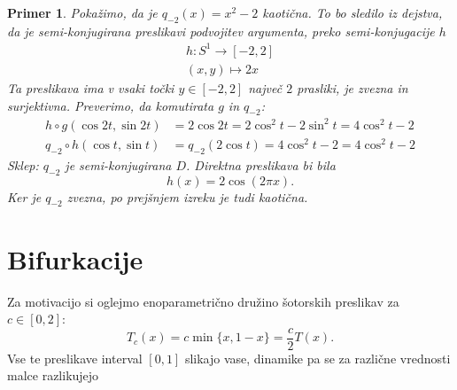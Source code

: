 \documentclass{article}
\newtheorem{primer}{Primer}
\begin{document}
\begin{primer}
Pokažimo, da je $q_{-2}(x) = x^2 - 2$ kaotična. To bo sledilo iz dejstva, da je 
semi-konjugirana preslikavi podvojitev argumenta, preko semi-konjugacije $h$ 
\begin{align*}
h: S^1 \rightarrow [-2, 2] \\ 
(x, y) \mapsto 2x 
\end{align*}
Ta preslikava ima v vsaki točki $y\in [-2, 2]$ največ $2$ prasliki, je zvezna in 
surjektivna. Preverimo, da komutirata $g$ in $q_{-2}$:
\begin{align*}
h\circ g(\cos{2t}, \sin{2t}) &= 2\cos{2t} = 2\cos^2{t} - 2\sin^2{t} = 4\cos^2{t} - 2\\
q_{-2}\circ h(\cos{t}, \sin{t}) &= q_{-2}(2\cos{t}) = 4\cos^2{t} - 2 = 4\cos^2{t} - 2
\end{align*}
Sklep: $q_{-2}$ je semi-konjugirana $D$. Direktna preslikava bi bila 
$$
h(x) = 2\cos(2\pi x).
$$
Ker je $q_{-2}$ zvezna, po prejšnjem izreku je tudi kaotična.
\end{primer}

\section{Bifurkacije}

Za motivacijo si oglejmo enoparametrično družino šotorskih preslikav za $c\in [0, 2]$:
$$
T_c(x) = c\min\{x, 1-x\} = \frac{c}{2} T(x).
$$
Vse te preslikave interval $[0, 1]$ slikajo vase, dinamike pa se za različne vrednosti malce razlikujejo
\end{document}
